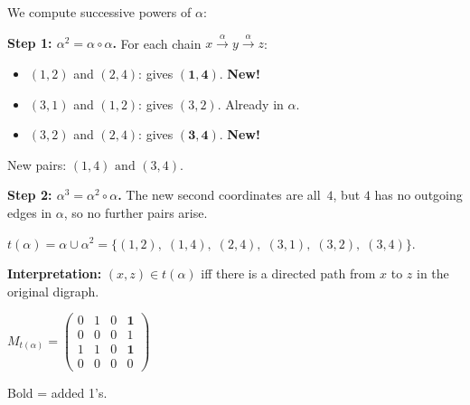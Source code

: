 \documentclass[12pt, a4paper]{article}
\begin{document}
\medskip

We compute successive powers of $\alpha$:

\textbf{Step 1: $\alpha^2 = \alpha \circ \alpha$.}\; For each chain $x \xrightarrow{\alpha} y \xrightarrow{\alpha} z$:
\begin{itemize}[nosep]
  \item $(1,2)$ and $(2,4)$: gives $\boldsymbol{(1,4)}$.  \textbf{New!}
  \item $(3,1)$ and $(1,2)$: gives $(3,2)$.  Already in $\alpha$.
  \item $(3,2)$ and $(2,4)$: gives $\boldsymbol{(3,4)}$.  \textbf{New!}
\end{itemize}
New pairs: $\boxed{(1,4) \text{ and } (3,4)}$.

\textbf{Step 2: $\alpha^3 = \alpha^2 \circ \alpha$.}\; The new second coordinates are all~$4$, but $4$ has no outgoing edges in $\alpha$, so no further pairs arise.

\begin{answerbox}
$t(\alpha) = \alpha \cup \alpha^2 = \{(1,2),\;(1,4),\;(2,4),\;(3,1),\;(3,2),\;(3,4)\}.$
\end{answerbox}

\textbf{Interpretation:} $(x, z) \in t(\alpha)$ iff there is a directed path from $x$ to $z$ in the original digraph.

\begin{center}
\begin{minipage}{0.45\textwidth}\centering
{}
\end{minipage}%
\begin{minipage}{0.45\textwidth}\centering
$M_{t(\alpha)} = \begin{pmatrix}
  0 & 1 & 0 & \mathbf{1} \\
  0 & 0 & 0 & 1 \\
  1 & 1 & 0 & \mathbf{1} \\
  0 & 0 & 0 & 0
\end{pmatrix}$

{\small\color{newEdge} Bold = added 1's.}
\end{minipage}
\end{center}
\end{document}
